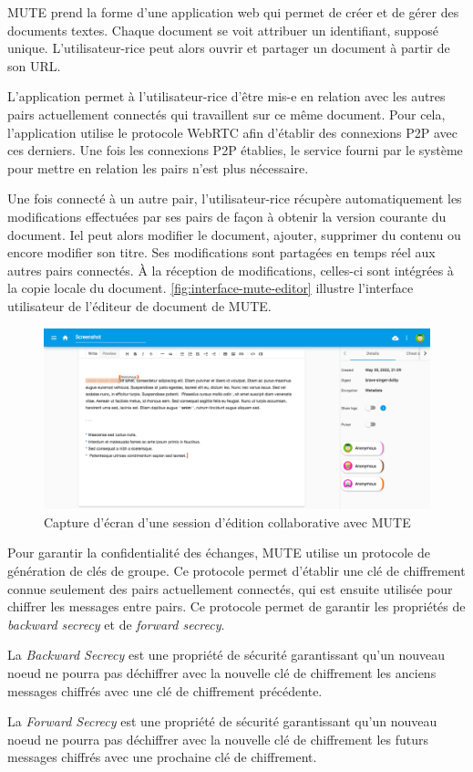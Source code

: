 \ac{MUTE} prend la forme d'une application web qui permet de créer et de gérer des documents textes.
Chaque document se voit attribuer un identifiant, supposé unique.
L'utilisateur-rice peut alors ouvrir et partager un document à partir de son URL.

L'application permet à l'utilisateur-rice d'être mis-e en relation avec les autres pairs actuellement connectés qui travaillent sur ce même document.
Pour cela, l'application utilise le protocole WebRTC afin d'établir des connexions \ac{P2P} avec ces derniers.
Une fois les connexions \ac{P2P} établies, le service fourni par le système pour mettre en relation les pairs n'est plus nécessaire.

Une fois connecté à un autre pair, l'utilisateur-rice récupère automatiquement les modifications effectuées par ses pairs de façon à obtenir la version courante du document.
Iel peut alors modifier le document, \ie ajouter, supprimer du contenu ou encore modifier son titre.
Ses modifications sont partagées en temps réel aux autres pairs connectés.
À la réception de modifications, celles-ci sont intégrées à la copie locale du document.
\autoref{fig:interface-mute-editor} illustre l'interface utilisateur de l'éditeur de document de MUTE.
\begin{figure}[!ht]
    \centering
    \includegraphics[width=\linewidth]{img/screenshot-mute-editor.png}
    \caption{Capture d'écran d'une session d'édition collaborative avec MUTE}
    \label{fig:interface-mute-editor}
\end{figure}

Pour garantir la confidentialité des échanges, \ac{MUTE} utilise un protocole de génération de clés de groupe.
Ce protocole permet d'établir une clé de chiffrement connue seulement des pairs actuellement connectés, qui est ensuite utilisée pour chiffrer les messages entre pairs.
Ce protocole permet de garantir les propriétés de \emph{backward secrecy} et de \emph{forward secrecy}.
\begin{definition}
    La \emph{Backward Secrecy} est une propriété de sécurité garantissant qu'un nouveau noeud ne pourra pas déchiffrer avec la nouvelle clé de chiffrement les anciens messages chiffrés avec une clé de chiffrement précédente.
\end{definition}
\begin{definition}
    La \emph{Forward Secrecy} est une propriété de sécurité garantissant qu'un nouveau noeud ne pourra pas déchiffrer avec la nouvelle clé de chiffrement les futurs messages chiffrés avec une prochaine clé de chiffrement.
\end{definition}

